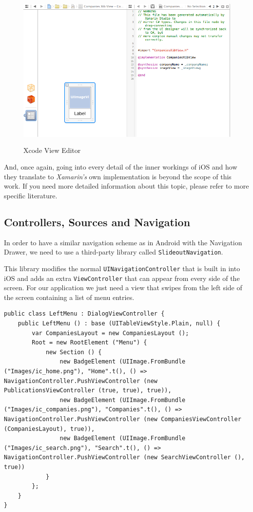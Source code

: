 \begin{figure}[H]
    \begin{center}
        {\includegraphics[width=1\linewidth]{gfx/xcode}}
        \caption[Xcode View Editor]{Xcode View Editor}
        \label{fig:xcode}
    \end{center}
\end{figure}

And, once again, going into every detail of the inner workings of iOS and how they translate to \textit{Xamarin's} own implementation is beyond the scope of this work. If you need more detailed information about this topic, please refer to more specific literature.

\subsection{Controllers, Sources and Navigation}

In order to have a similar navigation scheme as in Android with the Navigation Drawer, we need to use a third-party library called \texttt{SlideoutNavigation}. 

This library modifies the normal \texttt{UINavigationController} that is built in into iOS and adds an extra \texttt{ViewController} that can appear from every side of the screen. For our application we just need a view that swipes from the left side of the screen containing a list of menu entries.

\begin{lstlisting}[frame=lt,caption=LeftMenu.cs, label={list:ios_menu}]
public class LeftMenu : DialogViewController {
	public LeftMenu () : base (UITableViewStyle.Plain, null) {
		var CompaniesLayout = new CompaniesLayout ();
		Root = new RootElement ("Menu") {
			new Section () {
				new BadgeElement (UIImage.FromBundle ("Images/ic_home.png"), "Home".t(), () => NavigationController.PushViewController (new PublicationsViewController (true, true), true)),
				new BadgeElement (UIImage.FromBundle ("Images/ic_companies.png"), "Companies".t(), () => NavigationController.PushViewController (new CompaniesViewController (CompaniesLayout), true)),
				new BadgeElement (UIImage.FromBundle ("Images/ic_search.png"), "Search".t(), () => NavigationController.PushViewController (new SearchViewController (), true))
			}
		};
	}
}
\end{lstlisting}

